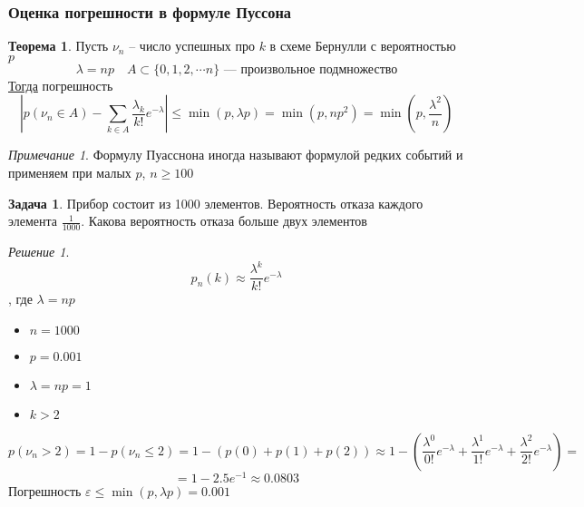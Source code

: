 \documentclass[english]{article}
\theoremstyle{plain}
\theoremstyle{remark}
\newtheorem*{remark}{Примечание}
\newtheorem*{solution}{Решение}
\theoremstyle{definition}
\newtheorem{task}{Задача}
\newtheorem{theorem}{Теорема}[section]
\begin{document}
\subsubsection{Оценка погрешности в формуле Пуссона}
\label{sec:org94a84bc}
\begin{theorem}
Пусть \(\nu_n\) -- число успешных про \(k\) в схеме Бернулли с вероятностью \(p\)
\[ \lambda = np\quad A \subset \{0, 1, 2, \dotsm n\}\text{ --- произвольное подмножество}\]
\uline{Тогда} погрешность
\[ \left|p(\nu_n \in A) - \sum_{k \in A} \frac{\lambda_k}{k!} e^{-\lambda}\right| \le \min(p, \lambda p) = \min(p, np^2) = \min\left(p, \frac{\lambda^2}{n}\right) \]
\end{theorem}
\begin{remark}
Формулу Пуасснона иногда называют формулой редких событий и применяем при малых \(p\), \(n \ge 100\)
\end{remark}
\begin{task}
Прибор состоит из 1000 элементов. Вероятность отказа каждого элемента \(\frac{1}{1000}\). Какова вероятность отказа больше двух элементов
\end{task}
\begin{solution}
\[ p_n(k) \approx \frac{\lambda^k}{k!}e^{-\lambda} \]
, где \(\lambda = np\)
\begin{itemize}
\item \(n = 1000\)
\item \(p = 0.001\)
\item \(\lambda = np = 1\)
\item \(k > 2\)
\end{itemize}
\[ p(\nu_n > 2) = 1 - p(\nu_n \le 2) = 1 - (p(0) + p(1) + p(2)) \approx 1 - \left(\frac{\lambda^0}{0!} e^{-\lambda} + \frac{\lambda^1}{1!}e^{-\lambda} + \frac{\lambda^2}{2!}e^{-\lambda}\right) = \]
\[ = 1 - 2.5e^{-1} \approx 0.0803\]
Погрешность \(\varepsilon \le \min(p, \lambda p) = 0.001\)
\end{solution}
\end{document}
